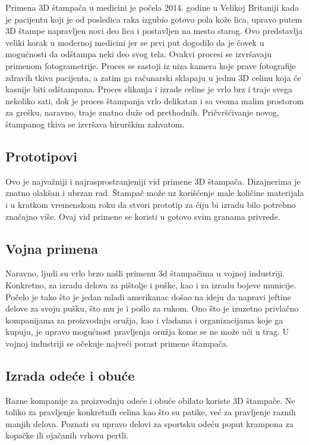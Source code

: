 \documentclass[a4paper]{article}
\begin{document}
Primena 3D štampača u medicini je počela 2014. godine u Velikoj Britaniji kada je pacijentu koji je od posledica raka izgubio gotovo pola kože lica, upravo putem 3D štampe napravljen novi deo lica i postavljen na mesto starog. Ovo predstavlja veliki korak u modernoj medicini jer se prvi put dogodilo da je čovek u mogućnosti da odštampa neki deo svog tela. 
\bigbreak Ovakvi procesi se izvršavaju primenom fotogrametrije. Proces se sastoji iz niza kamera koje prave fotografije zdravih tkiva pacijenta, a zatim ga računarski sklapaju u jednu 3D celinu koja će kasnije biti odštampana. Proces slikanja i izrade celine je vrlo brz i traje svega nekoliko sati, dok je proces štampanja vrlo delikatan i sa veoma malim prostorom za grešku, naravno, traje znatno duže od prethodnih. Pričvršćivanje novog, štampanog tkiva se izvršava hirurškim zahvatom.

\subsection{Prototipovi}
\label{subsec:podnaslov7}

Ovo je najvažniji i najrasprostranjeniji vid primene 3D štampača. Dizajnerima je znatno olakšan i ubrzan rad. Štampač može uz korišćenje male količine materijala i u kratkom vremenskom roku da stvori prototip za čiju bi izradu bilo potrebno značajno više. Ovaj vid primene se koristi u gotovo svim granama privrede.

\subsection{Vojna primena}
\label{subsec:podnaslov8}

Naravno, ljudi su vrlo brzo našli primenu 3d štampačima u vojnoj industriji. Konkretno, za izradu delova za pištolje i puške, kao i za izradu bojeve municije. Počelo je tako što je jedan mladi amerikanac došao na ideju da napravi jeftine delove za svoju pušku, što mu je i pošlo za rukom. Ono što je izuzetno privlačno kompanijama za proizvodnju oružja, kao i vladama i organizacijama koje ga kupuju, je upravo mogućnost pravljenja oružja kome se ne može ući u trag. U vojnoj industriji se očekuje najveći porast primene štampača. 

\subsection{Izrada odeće i obuće}
\label{subsec:podnaslov9}

Razne kompanije za proizvodnju odeće i obuće obilato koriste 3D štampače. Ne toliko za pravljenje konkretnih celina kao što su patike, već za pravljenje raznih manjih delova. Poznati su upravo delovi za sportsku odeću poput krampona za kopačke ili ojačanih vrhova pertli.
\end{document}
